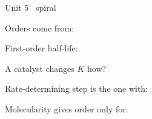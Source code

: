 \documentclass{apchem-worksheet}
\begin{document}
\begin{spiralstrip}{Unit 5 \textbullet\ spiral}
  \item Orders come from: 
  \item First-order half-life: 
  \item A catalyst changes $K$ how? 
  \item Rate-determining step is the one with:
  \item Molecularity gives order only for:
\end{spiralstrip}
\end{document}
